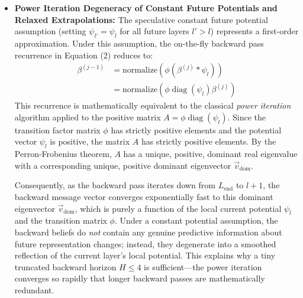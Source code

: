 \begin{itemize}
    By truncating the backward pass to a small constant $H \le 4$, we slash the cumulative single-pass complexity to $O(L H K^2)$, which is strictly linear in network depth $L$. For scaling to massive multi-expert registries (e.g., dense MoEs with $K \ge 64$ experts), the $O(L H K^2)$ cost could still scale quadratically in $K$. In such regimes, we propose two computational mitigations: (1) \emph{Sparse Transition Matrices:} Restricting expert transitions to a small $k$-nearest-neighbor subgraph of experts, reducing the transition matrix complexity to $O(L H K \log K)$, or (2) \emph{Hierarchical Message Passing:} Grouping experts into hierarchical functional domains, solving the MRF on a tree structure in $O(L H K)$ time (see Appendix \ref{sec:appendix_generalizations} for a formal mathematical sketch and derivation of tree-structured belief propagation).
    \item \textbf{Power Iteration Degeneracy of Constant Future Potentials and Relaxed Extrapolations:} The speculative constant future potential assumption (setting $\psi_{l'} = \psi_l$ for all future layers $l' > l$) represents a first-order approximation. Under this assumption, the on-the-fly backward pass recurrence in Equation (2) reduces to:
    \begin{equation}
    \begin{split}
        \beta^{(j-1)} &= \text{normalize}\left(\phi \left(\beta^{(j)} * \psi_l\right)\right) \\
        &= \text{normalize}\left(\phi \operatorname{diag}(\psi_l) \beta^{(j)}\right)
    \end{split}
    \end{equation}
    This recurrence is mathematically equivalent to the classical \emph{power iteration} algorithm applied to the positive matrix $A = \phi \operatorname{diag}(\psi_l)$. Since the transition factor matrix $\phi$ has strictly positive elements and the potential vector $\psi_l$ is positive, the matrix $A$ has strictly positive elements. By the Perron-Frobenius theorem, $A$ has a unique, positive, dominant real eigenvalue with a corresponding unique, positive dominant eigenvector $\vec{v}_{\text{dom}}$. 
    
    Consequently, as the backward pass iterates down from $L_{\text{end}}$ to $l+1$, the backward message vector converges exponentially fast to this dominant eigenvector $\vec{v}_{\text{dom}}$, which is purely a function of the local current potential $\psi_l$ and the transition matrix $\phi$. Under a constant potential assumption, the backward beliefs do \emph{not} contain any genuine predictive information about future representation changes; instead, they degenerate into a smoothed reflection of the current layer's local potential. This explains why a tiny truncated backward horizon $H \le 4$ is sufficient—the power iteration converges so rapidly that longer backward passes are mathematically redundant.
    

\end{itemize}
